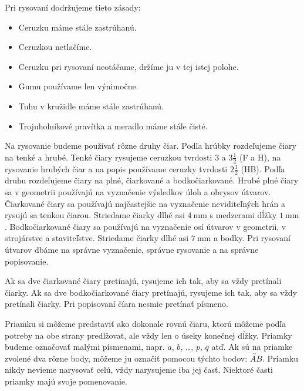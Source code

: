\documentclass{article}
\begin{document}
Pri rysovaní dodržujeme tieto zásady:
\begin{itemize}
  \item Ceruzku máme stále zastrúhanú.
  \item Ceruzkou netlačíme.
  \item Ceruzku pri rysovaní neotáčame, držíme ju v tej istej polohe.
  \item Gumu používame len výnimočne.
  \item Tuhu v kružidle máme stále zastrúhanú.
  \item Trojuholníkové pravítka a meradlo máme stále čisté.
\end{itemize}

Na rysovanie budeme používať rôzne druhy čiar. Podľa hrúbky rozdeľujeme čiary na tenké a hrubé. Tenké čiary rysujeme ceruzkou tvrdosti \(3\) a \(3 \frac{1}{2}\) (F a H), na rysovanie hrubých čiar a na popis používame ceruzky tvrdosti \(2 \frac{1}{2}\) (HB). Podľa druhu rozdeľujeme čiary na plné, čiarkované a bodkočiarkované. Hrubé plné čiary sa v geometrii používajú na vyznačenie výsledkov úloh a obrysov útvarov. Čiarkované čiary sa používajú najčastejšie na vyznačenie neviditeľných hrán a rysujú sa tenkou čiarou. Striedame čiarky dlhé asi \(\SI{4}{\mm}\) s medzerami dĺžky \(\SI{1}{\mm}\). Bodkočiarkované čiary sa používajú na vyznačenie osí útvarov v geometrii, v strojárstve a staviteľstve. Striedame čiarky dlhé asi \(\SI{7}{\mm}\) a bodky. Pri rysovaní útvarov dbáme na správne vyznačenie, správne rysovanie a na správne popisovanie.

Ak sa dve čiarkované čiary pretínajú, rysujeme ich tak, aby sa vždy pretínali čiarky.
Ak sa dve bodkočiarkované čiary pretínajú, rysujeme ich tak, aby sa vždy pretínali čiarky.
Pri popisovaní číara nesmie pretínať písmeno.

Priamku si môžeme predstaviť ako dokonale rovnú čiaru, ktorú môžeme podľa potreby na obe strany predlžovať, ale vždy len o úseky konečnej dĺžky. Priamky budeme označovať malými písmenami, napr. \(a\), \(b\), \dots, \(p\), \(q\) atď. Ak sú na priamke zvolené dva rôzne body, môžeme ju označiť pomocou týchto bodov: \(\overleftrightarrow{AB}\). Priamku nikdy nevieme narysovať celú, vždy narysujeme iba jej časť. Niektoré časti priamky majú svoje pomenovanie.


\end{document}
